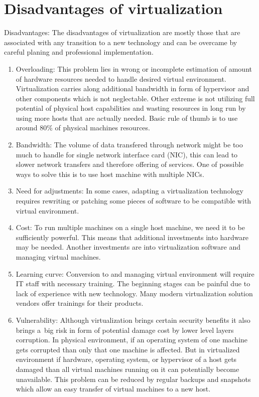 \section{Disadvantages of virtualization}
Disadvantages: 
The disadvantages of virtualization are mostly those that are associated with any transition to a new technology and can be overcame by careful planing and professional implementation.
\begin{enumerate}
\item Overloading: This problem lies in wrong or incomplete estimation of amount of hardware resources needed to handle desired virtual environment. Virtualization carries along additional bandwidth in form of hypervisor and other components which is not neglectable. Other extreme is not utilizing full potential of physical host capabilities and wasting resources in long run by using more hosts that are actually needed. Basic rule of thumb is to use around 80\% of physical machines resources.
\item Bandwidth: The volume of data transfered through network might be too much to handle for single network interface card (NIC), this can lead to slower network transfers and therefore offering of services. One of possible ways to solve this is to use host machine with multiple NICs.
\item Need for adjustments: In some cases, adapting a virtualization technology requires rewriting or patching some pieces of software to be compatible with virtual environment.
\item Cost: To run multiple machines on a single host machine, we need it to be sufficiently powerful. This means that additional investments into hardware may be needed. Another investments are into virtualization software and managing virtual machines.
\item Learning curve: Conversion to and managing virtual environment will require IT staff with necessary training. The beginning stages can be painful due to lack of experience with new technology. Many modern virtualization solution vendors offer trainings for their products.
\item Vulnerability: Although virtualization brings certain security benefits it also brings a~big risk in form of potential damage cost by lower level layers corruption. In physical environment, if an operating system of one machine gets corrupted than only that one machine is affected. But in virtualized environment if hardware, operating system, or hypervisor of a host gets damaged than all virtual machines running on it can potentially become unavailable. This problem can be reduced by regular backups and snapshots which allow an easy transfer of virtual machines to a new host.

\end{enumerate}
